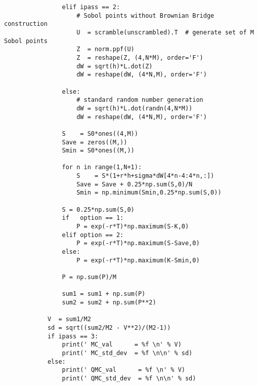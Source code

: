 \documentclass{article}
\begin{document}
\begin{lstlisting}
                elif ipass == 2:
                    # Sobol points without Brownian Bridge construction                    
                    U  = scramble(unscrambled).T  # generate set of M Sobol points
                    Z  = norm.ppf(U)        
                    Z  = reshape(Z, (4,N*M), order='F')
                    dW = sqrt(h)*L.dot(Z)
                    dW = reshape(dW, (4*N,M), order='F')

                else:
                    # standard random number generation
                    dW = sqrt(h)*L.dot(randn(4,N*M))
                    dW = reshape(dW, (4*N,M), order='F')

                S    = S0*ones((4,M))
                Save = zeros((M,))
                Smin = S0*ones((M,))

                for n in range(1,N+1):
                    S    = S*(1+r*h+sigma*dW[4*n-4:4*n,:])
                    Save = Save + 0.25*np.sum(S,0)/N
                    Smin = np.minimum(Smin,0.25*np.sum(S,0))

                S = 0.25*np.sum(S,0)
                if   option == 1:
                    P = exp(-r*T)*np.maximum(S-K,0)
                elif option == 2:
                    P = exp(-r*T)*np.maximum(S-Save,0)
                else:
                	P = exp(-r*T)*np.maximum(K-Smin,0)

                P = np.sum(P)/M

                sum1 = sum1 + np.sum(P)
                sum2 = sum2 + np.sum(P**2)

            V  = sum1/M2
            sd = sqrt((sum2/M2 - V**2)/(M2-1))
            if ipass == 3:
                print(' MC_val      = %f \n' % V)
                print(' MC_std_dev  = %f \n\n' % sd)
            else:
                print(' QMC_val      = %f \n' % V)
                print(' QMC_std_dev  = %f \n\n' % sd)           
\end{lstlisting}
\end{document}
